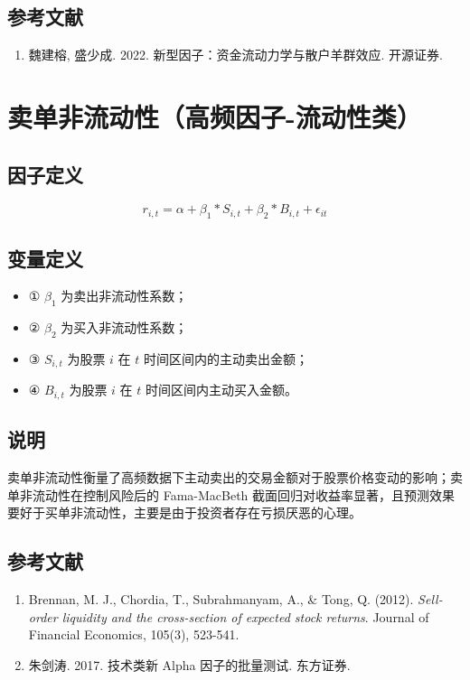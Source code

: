 \documentclass{article}
\begin{document}
\subsection{参考文献}
\begin{enumerate}
    \item 魏建榕, 盛少成. 2022. 新型因子：资金流动力学与散户羊群效应. 开源证券.
\end{enumerate}

\section{卖单非流动性（高频因子-流动性类）}

\subsection{因子定义}
\begin{equation}
    r_{i,t} = \alpha + \beta_1 * S_{i,t} + \beta_2 * B_{i,t} + \epsilon_{it}
\end{equation}

\subsection{变量定义}
\begin{itemize}
    \item ① \( \beta_1 \) 为卖出非流动性系数；
    \item ② \( \beta_2 \) 为买入非流动性系数；
    \item ③ \( S_{i,t} \) 为股票 \( i \) 在 \( t \) 时间区间内的主动卖出金额；
    \item ④ \( B_{i,t} \) 为股票 \( i \) 在 \( t \) 时间区间内主动买入金额。
\end{itemize}

\subsection{说明}
卖单非流动性衡量了高频数据下主动卖出的交易金额对于股票价格变动的影响；卖单非流动性在控制风险后的 Fama-MacBeth 截面回归对收益率显著，且预测效果要好于买单非流动性，主要是由于投资者存在亏损厌恶的心理。

\subsection{参考文献}
\begin{enumerate}
    \item Brennan, M. J., Chordia, T., Subrahmanyam, A., \& Tong, Q. (2012). \textit{Sell-order liquidity and the cross-section of expected stock returns}. Journal of Financial Economics, 105(3), 523-541.
    \item 朱剑涛. 2017. 技术类新 Alpha 因子的批量测试. 东方证券.
\end{enumerate}
\end{document}
